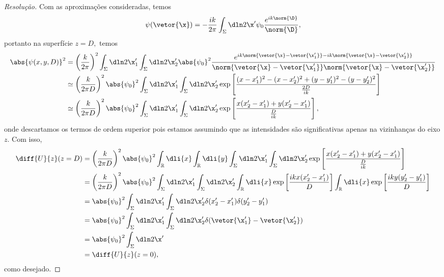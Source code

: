 \begin{proof}[Resolução]
    Com as aproximações consideradas, temos
    \begin{equation*}
        \psi(\vetor{\x}) = -\frac{ik}{2\pi} \int_{\Sigma} \dln2{\x'} \psi_0 \frac{e^{ik \norm{\D}}}{\norm{\D}},
    \end{equation*}
    portanto na superfície \(z = D,\) temos
    \begin{align*}
        \abs{\psi(x,y,D)}^2 &= \left(\frac{k}{2\pi}\right)^2 \int_{\Sigma} \dln2{\x'_1} \int_{\Sigma} \dln2{\x'_2} \abs{\psi_0}^2 \frac{e^{ik\norm{\vetor{\x} - \vetor{\x'_1}} - ik\norm{\vetor{\x} - \vetor{\x'_2}}}}{\norm{\vetor{\x} - \vetor{\x'_1}} \norm{\vetor{\x} - \vetor{\x'_2}}}\\
                            &\simeq \left(\frac{k}{2\pi D}\right)^2 \abs{\psi_0}^2 \int_{\Sigma} \dln2{\x'_1} \int_{\Sigma}\dln2{\x'_2} \exp\left[\frac{(x - x_1')^2 - (x - x_2')^2 + (y - y_1')^2 - (y - y_2')^2}{\frac{2D}{ik}}\right]\\
                            &\simeq \left(\frac{k}{2\pi D}\right)^2 \abs{\psi_0}^2 \int_{\Sigma} \dln2{\x'_1} \int_{\Sigma}\dln2{\x'_2} \exp\left[\frac{x (x_2' - x_1') + y(x_2' - x_1')}{\frac{D}{ik}}\right],
    \end{align*}
    onde descartamos os termos de ordem superior pois estamos assumindo que as intensidades são significativas apenas na vizinhanças do eixo \(z\). Com isso,
    \begin{align*}
        \diff{U}{z}(z = D) &= \left(\frac{k}{2\pi D}\right)^2\abs{\psi_0}^2 \int_{\mathbb{R}} \dli{x} \int_{\mathbb{R}}\dli{y}  \int_{\Sigma} \dln2{\x'_1} \int_{\Sigma}\dln2{\x'_2} \exp\left[\frac{x (x_2' - x_1') + y(x_2' - x_1')}{\frac{D}{ik}}\right]\\
                           &= \left(\frac{k}{2\pi D}\right)^2\abs{\psi_0}^2 \int_{\Sigma} \dln2{\x'_1} \int_{\Sigma}\dln2{\x'_2}\int_{\mathbb{R}} \dli{x} \exp\left[\frac{ik x(x_2' - x_1')}{D}\right] \int_{\mathbb{R}} \dli{x} \exp\left[\frac{ik y(y_2' - y_1')}{D}\right]\\
                           &=  \abs{\psi_0}^2 \int_{\Sigma} \dln2{\x_1'} \int_{\Sigma} \dln2{\x_2'} \delta(x'_2 - x'_1) \delta(y_2' - y_1')\\
                           &= \abs{\psi_0}^2 \int_{\Sigma} \dln2{\x_1'} \int_{\Sigma} \dln2{\x_2'} \delta(\vetor{\x_1'} - \vetor{\x_2'})\\
                           &= \abs{\psi_0}^2 \int_{\Sigma} \dln2{\x'}\\
                           &= \diff{U}{z} (z = 0),
    \end{align*}
    como desejado.
\end{proof}
